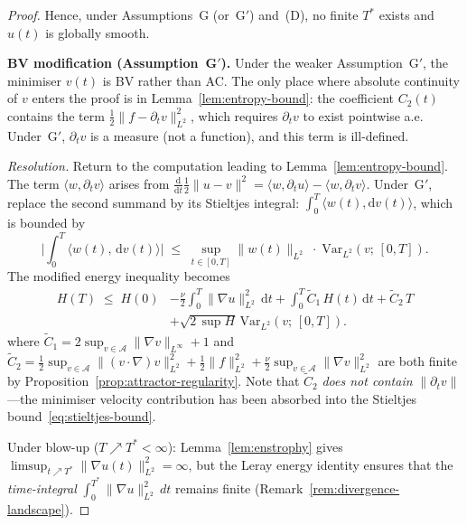 \documentclass[12pt,a4paper]{article}
\theoremstyle{definition}
\theoremstyle{plain}
\theoremstyle{remark}
\begin{document}
\begin{proof}
Hence, under Assumptions~G (or~G$'$) and~(D), no finite $T^*$ exists
and $u(t)$ is globally smooth.

\medskip
\noindent\textbf{BV modification (Assumption~G$'$).}\;
Under the weaker Assumption~G$'$, the minimiser $v(t)$ is BV rather
than AC. The only place where absolute continuity of $v$ enters the
proof is in Lemma~\ref{lem:entropy-bound}: the coefficient
$C_2(t)$ contains the term $\tfrac{1}{2}\|f - \partial_t v\|_{L^2}^2$,
which requires $\partial_t v$ to exist pointwise a.e. Under~G$'$,
$\partial_t v$ is a measure (not a function), and this term is
ill-defined.

\emph{Resolution.}\;
Return to the computation leading to Lemma~\ref{lem:entropy-bound}.
The term $\langle w, \partial_t v\rangle$ arises from
$\frac{\mathrm{d}}{\mathrm{d}t}\tfrac{1}{2}\|u-v\|^2
= \langle w, \partial_t u\rangle - \langle w, \partial_t v\rangle$.
Under~G$'$, replace the second summand by its Stieltjes integral:
$\int_0^T \langle w(t), \mathrm{d}v(t)\rangle$, which is bounded by
\begin{equation}\label{eq:stieltjes-bound}
  \biggl|\int_0^T \langle w(t),\, \mathrm{d}v(t)\rangle\biggr|
  \;\le\;
  \sup_{t \in [0,T]} \|w(t)\|_{L^2}
  \;\cdot\;
  \mathrm{Var}_{L^2}(v;\, [0,T]).
\end{equation}
The modified energy inequality becomes
\begin{equation}\label{eq:H-integral-BV}
\begin{aligned}
  H(T) \;\le\; H(0)
  &-\frac{\nu}{2}\int_0^T \|\nabla u\|_{L^2}^2\,\mathrm{d}t
   + \int_0^T \widetilde{C}_1\,H(t)\,\mathrm{d}t
   + \widetilde{C}_2\,T \\
  &+ \sqrt{2\,\sup H}\,
   \mathrm{Var}_{L^2}(v;\,[0,T]).
\end{aligned}
\end{equation}
where $\widetilde{C}_1 = 2\sup_{v \in \mathcal{A}}
\|\nabla v\|_{L^\infty} + 1$ and $\widetilde{C}_2 =
\tfrac{1}{2}\sup_{v \in \mathcal{A}}\|(v\cdot\nabla)v\|_{L^2}^2
+ \tfrac{1}{2}\|f\|_{L^2}^2 + \tfrac{\nu}{2}\sup_{v \in \mathcal{A}}
\|\nabla v\|_{L^2}^2$ are both finite by
Proposition~\ref{prop:attractor-regularity}. Note that $\widetilde{C}_2$
\emph{does not contain} $\|\partial_t v\|$---the minimiser velocity
contribution has been absorbed into the
Stieltjes bound~\eqref{eq:stieltjes-bound}.

Under blow-up ($T \nearrow T^* < \infty$):
Lemma~\ref{lem:enstrophy} gives
$\limsup_{t\nearrow T^*}\|\nabla u(t)\|_{L^2}^2=\infty$, but the
Leray energy identity ensures that the \emph{time-integral}
$\int_0^{T^*}\|\nabla u\|_{L^2}^2\,dt$ remains finite
(Remark~\ref{rem:divergence-landscape}).


\end{proof}
\end{document}
